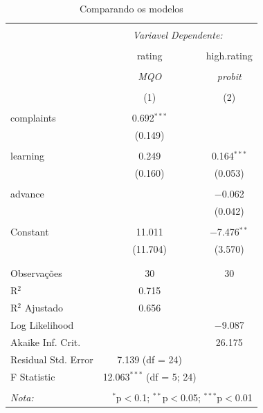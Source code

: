\documentclass[onehalfspacing, a4paper, 12pt]{econometria}
\begin{document}
\begin{table}[!htbp] \centering 
\caption{Comparando os modelos} 
\label{} 
\footnotesize 
\begin{tabular}{@{\extracolsep{5pt}}lcc} 
\\[-1.8ex]\hline 
\hline \\[-1.8ex]       & \multicolumn{2}{c}{\textit{Variavel Dependente:}} \\ \cline{2-3} 
\\[-1.8ex]              & rating                        & high.rating \\ 
\\[-1.8ex]              & \textit{MQO}                  & \textit{probit} \\ 
\\[-1.8ex]              & (1)                           & (2)\\ \hline \\[-1.8ex] 
complaints              & 0.692$^{***}$                 &  \\ 
                        & (0.149)                       &  \\ 
                        &                               & \\ 
learning                & 0.249                         & 0.164$^{***}$ \\ 
                        & (0.160)                       & (0.053) \\ 
                        &                               & \\ 
advance                 &                               & $-$0.062 \\ 
                        &                               & (0.042) \\ 
                        &                               & \\ 
Constant                & 11.011                        & $-$7.476$^{**}$ \\ 
                        & (11.704)                      & (3.570) \\ 
                        &                               & \\ \hline \\[-1.8ex] 
Observações             & 30                            & 30 \\ 
R$^{2}$                 & 0.715                         &  \\ 
R$^{2}$ Ajustado        & 0.656                         &  \\ 
Log Likelihood          &                               & $-$9.087 \\ 
Akaike Inf. Crit.       &                               & 26.175 \\ 
Residual Std. Error     & 7.139 (df = 24)               &  \\ 
F Statistic             & 12.063$^{***}$ (df = 5; 24)   &  \\ 
\hline 
\hline \\[-1.8ex] 
\textit{Nota:}  & \multicolumn{2}{r}{$^{*}$p$<$0.1; $^{**}$p$<$0.05; $^{***}$p$<$0.01} \\ 
\end{tabular} 
\end{table} 
\end{document}
